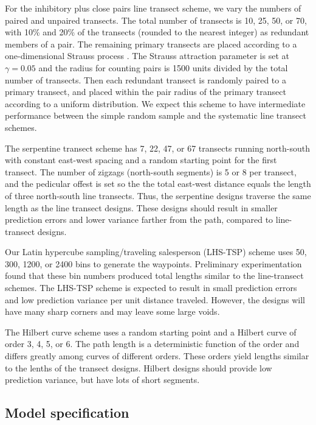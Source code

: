 \documentclass[review]{elsarticle}
\begin{document}
For the inhibitory plus close pairs line transect scheme, we vary the numbers of
paired and unpaired transects. The total number of transects is 10, 25, 50, or
70, with 10\% and 20\% of the transects (rounded to the nearest integer) as
redundant members of a pair. The remaining primary transects are placed
according to a one-dimensional Strauss process \citep{strauss,kellyripley}. The
Strauss attraction parameter is set at \(\gamma = 0.05\) and the radius for
counting pairs is 1500 units divided by the total number of transects. Then
each redundant transect is randomly paired to a primary transect, and placed
within the pair radius of the primary transect according to a uniform
distribution. We expect this scheme to have intermediate performance between
the simple random sample and the systematic line transect schemes.

The serpentine transect scheme has 7, 22, 47, or 67 transects running
north-south with constant east-west spacing and a random starting point for the
first transect. The number of zigzags (north-south segments) is 5 or 8 per
transect, and the pedicular offest is set so the the total east-west
distance equals the length of three north-south line transects. Thus, the
serpentine designs traverse the same length as the line transect designs. These
designs should result in smaller prediction errors and lower variance farther
from the path, compared to line-transect designs.

Our Latin hypercube sampling/traveling salesperson (LHS-TSP) scheme uses 50,
300, 1200, or 2400 bins to generate the waypoints. Preliminary experimentation
found that these bin numbers produced total lengths similar to the
line-transect schemes. The LHS-TSP scheme is expected to result in small
prediction errors and low prediction variance per unit distance traveled.
However, the designs will have many sharp corners and may leave some large
voids.

The Hilbert curve scheme uses a random starting point and a Hilbert curve of
order 3, 4, 5, or 6. The path length is a deterministic function of the order
and differs greatly among curves of different orders. These orders yield
lengths similar to the lenths of the transect designs. Hilbert designs should
provide low prediction variance, but have lots of short segments.


\subsection{Model specification}
\end{document}
